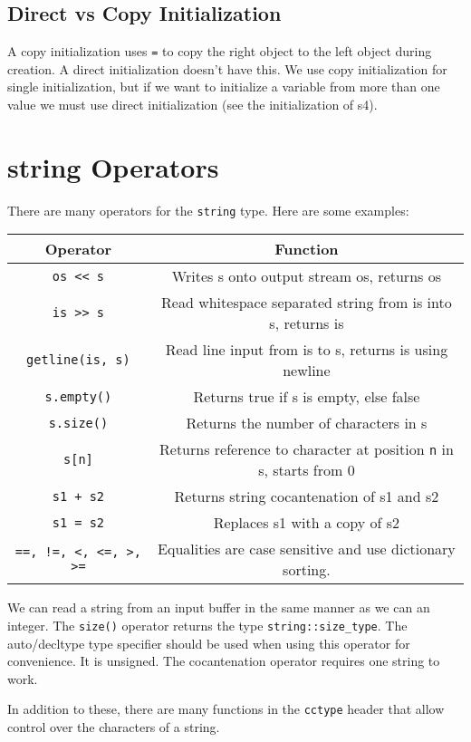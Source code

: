 \documentclass[12pt, a4paper]{report}
\begin{document}
\subsection{Direct vs Copy Initialization}
A copy initialization uses \verb|=| to copy the right object to the left object during creation. A direct initialization doesn't have this.
We use copy initialization for single initialization, but if we want to initialize a variable from more than one value we must use direct initialization
(see the initialization of s4).
\section{string Operators}
There are many operators for the \verb|string| type. Here are some examples:
\begin{center}
	\begin{tabular}{ |c|c| }
		\hline
		\textbf{Operator} & \textbf{Function} \\
		\hline
		\verb|os << s| & Writes s onto output stream os, returns os \\
		\hline
		\verb|is >> s| & Read whitespace separated string from is into s, returns is \\
		\hline
		\verb|getline(is, s)| & Read line input from is to s, returns is using newline \\
		\hline
		\verb|s.empty()| & Returns true if s is empty, else false \\
		\hline
		\verb|s.size()| & Returns the number of characters in s \\
		\hline
		\verb|s[n]| & Returns reference to character at position \verb|n| in s, starts from 0 \\
		\hline
		\verb|s1 + s2| & Returns string cocantenation of s1 and s2 \\
		\hline
		\verb|s1 = s2| & Replaces s1 with a copy of s2 \\
		\hline
		\verb|==, !=, <, <=, >, >=| & Equalities are case sensitive and use dictionary sorting. \\
		\hline
	\end{tabular}
\end{center}
We can read a string from an input buffer in the same manner as we can an integer. The \verb|size()| operator returns the type \verb|string::size_type|.
The auto/decltype type specifier should be used when using this operator for convenience. It is unsigned.
The cocantenation operator requires one string to work. 

In addition to these, there are many functions in the \verb|cctype| header that allow control over the characters of a string.
\end{document}
